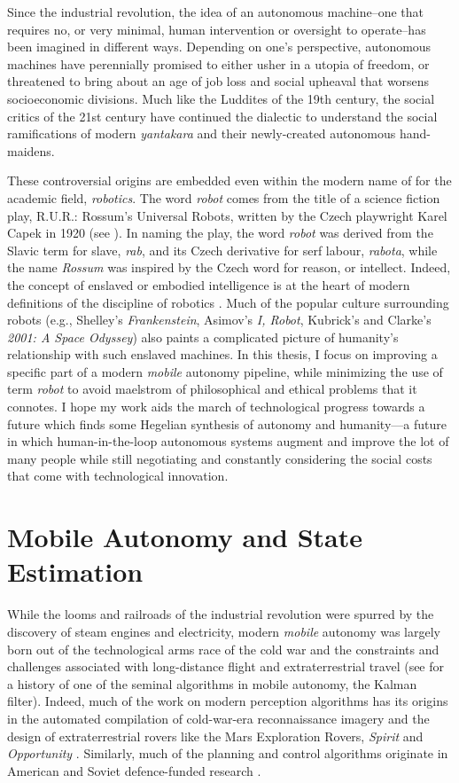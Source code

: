 Since the industrial revolution, the idea of an autonomous machine--one that requires no, or very minimal, human intervention or oversight to operate--has been imagined in different ways. Depending on one's perspective, autonomous machines have perennially promised to either usher in a utopia of freedom, or threatened to bring about an age of job loss and social upheaval that worsens socioeconomic divisions. Much like the Luddites of the 19th century, the social critics of the 21st century have continued the dialectic to understand the social ramifications of modern \textit{yantakara} and their newly-created autonomous hand-maidens.

These controversial origins are embedded even within the modern name of for the academic field, \textit{robotics}. The word \textit{robot} comes from the title of a science fiction play, R.U.R.: Rossum's Universal Robots, written by the Czech playwright Karel Capek in 1920 (see ). In naming the play, the word \textit{robot} was derived from the Slavic term for slave, \textit{rab}, and its Czech derivative for serf labour, \textit{rabota}, while the name \textit{Rossum} was inspired by the Czech word for reason, or intellect. Indeed, the concept of enslaved or embodied  intelligence is at the heart of modern definitions of the discipline of robotics \citep{Redfield2019-pi}. Much of the popular culture surrounding robots (e.g., Shelley's \textit{Frankenstein}, Asimov's \textit{I, Robot}, Kubrick's and Clarke's \textit{2001: A Space Odyssey}) also paints a complicated picture of humanity's relationship with such enslaved machines. In this thesis, I focus on improving a specific part of a modern \textit{mobile} autonomy pipeline, while minimizing the use of term \textit{robot} to avoid maelstrom of philosophical and ethical problems that it connotes. I hope my work aids the march of technological progress towards a future which finds some Hegelian synthesis of autonomy and humanity---a future in which human-in-the-loop autonomous systems augment and improve the lot of many people while still negotiating and constantly considering the social costs that come with technological innovation.

\section{Mobile Autonomy and State Estimation}
While the looms and railroads of the industrial revolution were spurred by the discovery of steam engines and electricity, modern \textit{mobile} autonomy was largely born out of the technological arms race of the cold war and the constraints and challenges associated with long-distance flight and extraterrestrial travel (see \cite{Grewal2010-ts} for a history of one of the seminal algorithms in mobile autonomy, the Kalman filter). Indeed, much of the work on modern perception algorithms has its origins in the automated compilation of cold-war-era reconnaissance imagery and the design of extraterrestrial rovers like the Mars Exploration Rovers, \textit{Spirit} and \textit{Opportunity} \citep{Scaramuzza2011-qr}. Similarly, much of the planning and control algorithms originate in American and Soviet defence-funded research \citep{Nilsson1984-oc,Thrun2006-hb}.

